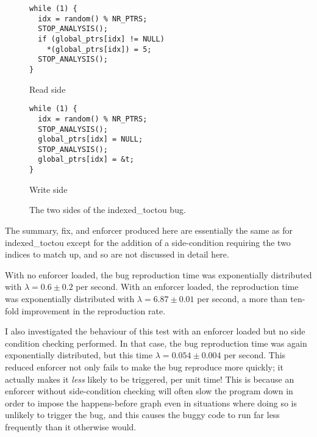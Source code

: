 \begin{figure}
  \begin{subfloat}
    \begin{minipage}{70mm}
\begin{verbatim}
while (1) {
  idx = random() % NR_PTRS;
  STOP_ANALYSIS();
  if (global_ptrs[idx] != NULL)
    *(global_ptrs[idx]) = 5;
  STOP_ANALYSIS();
}
\end{verbatim}
    \end{minipage}
    \caption{Read side}
  \end{subfloat}
  \begin{subfloat}
    \begin{minipage}{70mm}
\begin{verbatim}
while (1) {
  idx = random() % NR_PTRS;
  STOP_ANALYSIS();
  global_ptrs[idx] = NULL;
  STOP_ANALYSIS();
  global_ptrs[idx] = &t;
}
\end{verbatim}
    \end{minipage}
    \caption{Write side}
  \end{subfloat}
  \caption{The two sides of the indexed\_toctou bug.}
  \label{fig:eval:indexed_toctou}
\end{figure}

The summary, fix, and enforcer produced here are essentially the same
as for indexed\_toctou except for the addition of a side-condition
requiring the two indices to match up, and so are not discussed in
detail here.

With no enforcer loaded, the bug reproduction time was exponentially
distributed with $\lambda = 0.6 \pm 0.2$ per second.  With an enforcer
loaded, the reproduction time was exponentially distributed with
$\lambda = 6.87 \pm 0.01$ per second, a more than ten-fold improvement
in the reproduction rate.

I also investigated the behaviour of this test with an enforcer loaded
but no side condition checking performed.  In that case, the bug
reproduction time was again exponentially distributed, but this time
$\lambda = 0.054 \pm 0.004$ per second.  This reduced enforcer not
only fails to make the bug reproduce more quickly; it actually makes
it \emph{less} likely to be triggered, per unit time!  This is because
an enforcer without side-condition checking will often slow the
program down in order to impose the happens-before graph even in
situations where doing so is unlikely to trigger the bug, and this
causes the buggy code to run far less frequently than it otherwise
would.


